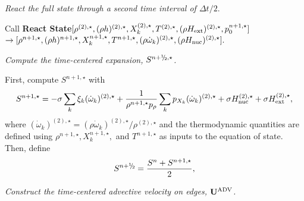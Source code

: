 \documentclass{aastex62}
\newcommand{\sfrac}[2]{\mathchoice
  {\kern0em\raise.5ex\hbox{\the\scriptfont0 #1}\kern-.15em/
   \kern-.15em\lower.25ex\hbox{\the\scriptfont0 #2}}
  {\kern0em\raise.5ex\hbox{\the\scriptfont0 #1}\kern-.15em/
   \kern-.15em\lower.25ex\hbox{\the\scriptfont0 #2}}
  {\kern0em\raise.5ex\hbox{\the\scriptscriptfont0 #1}\kern-.2em/
   \kern-.15em\lower.25ex\hbox{\the\scriptscriptfont0 #2}}
  {#1\!/#2}}
\newcommand{\myhalf}{\sfrac{1}{2}}
\newcommand{\Ub}{{\bf{U}}}
\newcommand{\dt}{\Delta t}
\newcommand{\Hext}{H_{\rm ext}}
\newcommand{\Hnuc}{H_{\rm nuc}}
\newcommand{\omegadot}{\dot\omega}
\newcommand{\nph}{{n+\myhalf}}
\newcommand{\uadvtwo}{\Ub^{\mathrm{ADV}}}
\begin{document}
\begin{description}
\item[Step 5.] {\em React the full state through a second time interval of $\dt / 2.$}

Call {\bf React State}$[ \rho^{(2),\star},(\rho h)^{(2),\star}, X_k^{(2),\star}, T^{(2),\star},
(\rho\Hext)^{(2),\star}, p_0^{n+1,\star}]$\\
\phantom{ }\hfill $\rightarrow [ \rho^{n+1,\star},(\rho h)^{n+1,\star}, X_k^{n+1,\star}, T^{n+1,\star}, (\rho \omegadot_k)^{(2),\star}, (\rho \Hnuc)^{(2),\star} ].$

\item[Step 6.] {\em Compute the time-centered expansion, $S^{\nph,\star}$.}

\item First, compute $S^{n+1,\star}$ with
\begin{equation}
S^{n+1,\star} =  -\sigma  \sum_k  \xi_k  (\omegadot_k)^{(2),\star}  + \frac{1}{\rho^{n+1,\star} p_\rho} \sum_k p_{X_k}  ({\omegadot}_k)^{(2),\star} + \sigma \Hnuc^{(2),\star} + \sigma \Hext^{(2),\star},
\end{equation}
  where $(\omegadot_k)^{(2),\star} = (\rho \omegadot_k)^{(2),\star} /
  \rho^{(2),\star}$ and the thermodynamic quantities are defined using
  $\rho^{n+1,\star}, X_k^{n+1,\star},$ and $T^{n+1,\star}$ as inputs to
  the equation of state.  Then, define
\begin{equation}
 S^{\nph} = \frac{S^n + S^{n+1,\star}}{2},
\end{equation}

\item[Step 7.] {\em Construct the time-centered advective velocity on edges, $\uadvtwo$.}


\end{description}
\end{document}
